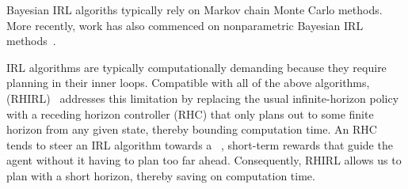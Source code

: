 \noindent
Bayesian IRL algoriths typically rely on Markov chain Monte Carlo methods.
%
More recently, work has also commenced on
nonparametric Bayesian IRL methods~\cite{}.


IRL algorithms are typically computationally demanding because they
require planning in their inner loops.
%
Compatible with all of the above algorithms,  (RHIRL)~\cite{macglashan15b} addresses this limitation by
replacing the usual infinite-horizon policy with a receding horizon
controller (RHC) that only plans out to some finite horizon from any
given state, thereby bounding computation time. An RHC tends to steer
an IRL algorithm towards a ~\cite{},
short-term rewards that guide the agent without it having to plan too
far ahead.  Consequently, RHIRL allows us to plan with a short
horizon, thereby saving on computation time.

